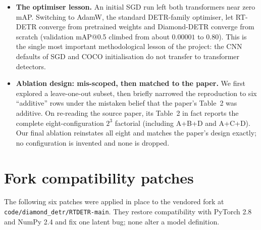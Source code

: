 \documentclass[11pt,a4paper]{article}
\begin{document}
\begin{itemize}[leftmargin=1.5em,itemsep=3pt,topsep=2pt]
        Diamond-DETR trained weights are published anywhere, so Diamond-DETR trains from random init.
  \item \textbf{The optimiser lesson.} An initial SGD run left both transformers near zero mAP.
        Switching to AdamW, the standard DETR-family optimiser, let RT-DETR converge from pretrained
        weights and Diamond-DETR converge from scratch (validation mAP@0.5 climbed from about
        $0.00001$ to $0.80$). This is the single most important methodological lesson of the project:
        the CNN defaults of SGD and COCO initialisation do not transfer to transformer detectors.
  \item \textbf{Ablation design: mis-scoped, then matched to the paper.} We first explored a
        leave-one-out subset, then briefly narrowed the reproduction to six ``additive'' rows under the
        mistaken belief that the paper's Table~2 was additive. On re-reading the source paper, its
        Table~2 in fact reports the complete eight-configuration $2^3$ factorial (including A+B+D and
        A+C+D). Our final ablation reinstates all eight and matches the paper's design exactly; no
        configuration is invented and none is dropped.
\end{itemize}

\section{Fork compatibility patches}\label{app:patches}
The following six patches were applied in place to the vendored fork at
\texttt{code/diamond\_detr/RTDETR-main}. They restore compatibility with PyTorch 2.8 and NumPy 2.4
and fix one latent bug; none alter a model definition.
\end{document}
